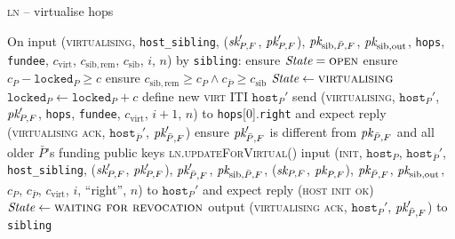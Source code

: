 \begin{center}
\begin{processbox}{\textsc{ln} -- virtualise hops}
\begin{algorithmic}[1]
      \State On input (\textsc{virtualising}, \texttt{host\_sibling}, ($\textit{sk}_{P,
      F}'$, $\textit{pk}_{P, F}'$), $\textit{pk}_{\mathrm{sib}, \bar{P}, F}$, $\textit{pk}_{\mathrm{sib},
      \mathrm{out}}$, \texttt{hops}, \texttt{fundee}, $c_{\mathrm{virt}}$,
      $c_{\mathrm{sib}, \mathrm{rem}}$, $c_{\mathrm{sib}}$, $i$, $n$) by
      \texttt{sibling}:
      \Indent
        \State ensure $\itistate = \textsc{open}$
        \State ensure $c_P - \texttt{locked}_P \geq c$
        \State ensure $c_{\mathrm{sib}, \mathrm{rem}} \geq c_P \wedge
        c_{\bar{P}} \geq c_{\mathrm{sib}}$ 
        \State $\itistate \gets \textsc{virtualising}$
        \State $\texttt{locked}_P \gets \texttt{locked}_P + c$
        \State define new \textsc{virt} ITI $\texttt{host}_P'$
        \State send (\textsc{virtualising}, $\texttt{host}_P'$, $\textit{pk}_{P, F}'$,
        \texttt{hops}, \texttt{fundee}, $c_{\mathrm{virt}}$, $i+1$, $n$) to
        \texttt{hops}[0].\texttt{right} and expect reply (\textsc{virtualising
        ack}, $\texttt{host}_{\bar{P}}'$, $\textit{pk}_{\bar{P}, F}'$)
        \State ensure $\textit{pk}_{\bar{P}, F}'$ is different from $\textit{pk}_{\bar{P}, F}$ and
        all older $\bar{P}$'s funding public keys
        \State \textsc{ln}.\textsc{updateForVirtual}()
        \State input (\textsc{init}, $\texttt{host}_P$,
        $\texttt{host}_{\bar{P}}'$, \texttt{host\_sibling}, ($\textit{sk}_{P, F}'$,
        $\textit{pk}_{P, F}'$), $\textit{pk}_{\bar{P}, F}'$, $\textit{pk}_{\mathrm{sib}, \bar{P}, F}$,
        ($\textit{sk}_{P, F}$, $\textit{pk}_{P, F}$), $\textit{pk}_{\bar{P}, F}$, $\textit{pk}_{\mathrm{sib},
        \mathrm{out}}$, $c_P$, $c_{\bar{P}}$, $c_{\mathrm{virt}}$, $i$,
        ``right'', $n$) to $\texttt{host}_P'$ and expect reply (\textsc{host
        init ok})
        \State $\itistate \gets \textsc{waiting for revocation}$
        \State output (\textsc{virtualising ack}, $\texttt{host}_P'$,
        $\textit{pk}_{\bar{P}, F}'$) to \texttt{sibling}
      \EndIndent
    \end{algorithmic}
  \end{processbox}
  \label{code:ln:open:virtualise:hops}
\end{center} \ \\

